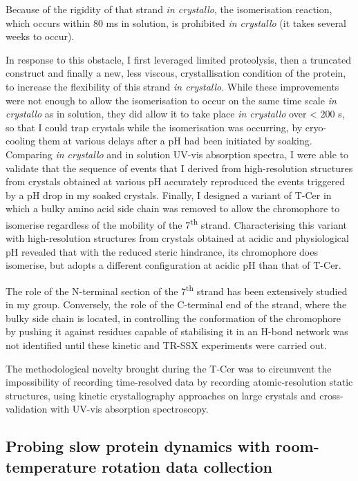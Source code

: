 Because of the rigidity of that strand \textit{in crystallo}, the isomerisation reaction, which occurs within 80 ms in solution, is prohibited \textit{in crystallo} (it takes several weeks to occur). 

In response to this obstacle, I first leveraged limited proteolysis, then a truncated construct and finally a new, less viscous, crystallisation condition of the protein, to increase the flexibility of this strand \textit{in crystallo}. While these improvements were not enough to allow the isomerisation to occur on the same time scale \textit{in crystallo} as in solution, they did allow it to take place \textit{in crystallo} over < 200 s, so that I could trap crystals while the isomerisation was occurring, by cryo-cooling them at various delays after a pH had been initiated by soaking. Comparing \textit{in crystallo} and in solution UV-vis absorption spectra, I were able to validate that the sequence of events that I derived from high-resolution structures from crystals obtained at various pH accurately reproduced the events triggered by a pH drop in my soaked crystals. Finally, I designed a variant of T-Cer in which a bulky amino acid side chain was removed to allow the chromophore to isomerise regardless of the mobility of the 7\textsuperscript{th} strand. Characterising this variant with high-resolution structures from crystals obtained at acidic and physiological pH revealed that with the reduced steric hindrance, its chromophore does isomerise, but adopts a different configuration at acidic pH than that of T-Cer. 

The role of the N-terminal section of the 7\textsuperscript{th} strand has been extensively studied in my group. Conversely, the role of the C-terminal end of the strand, where the bulky side chain is located, in controlling the conformation of the chromophore by pushing it against residues capable of stabilising it in an H-bond network was not identified until these kinetic and TR-SSX experiments were carried out.

\vspace{2mm}

The methodological novelty brought during the T-Cer was to circumvent the impossibility of recording time-resolved data by recording atomic-resolution static structures, using kinetic crystallography approaches on large crystals and cross-validation with UV-vis absorption spectroscopy. 

\subsection{Probing slow protein dynamics with room-temperature rotation data collection}


